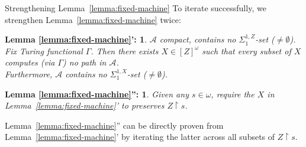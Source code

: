\begin{frame}{Strengthening Lemma~\ref{lemma:fixed-machine}}
  To iterate successfully, we strengthen Lemma~\ref{lemma:fixed-machine}
  twice:
  \newtheorem*{lemma-strengthened1*}{Lemma \ref{lemma:fixed-machine}':}
  \begin{lemma-strengthened1*}
    $\mathcal{A}$ compact, contains no $\Sigma_1^{1,Z}$-set
    ($\neq\emptyset$). Fix Turing functional $\Gamma$. Then
    there exists $X\in[Z]^\omega$ such that every subset of $X$ computes
    (via $\Gamma$) no path in $\mathcal{A}$.\\
    \vspace{0.5em}
    Furthermore, $\mathcal{A}$ contains no $\Sigma_1^{1,X}$-set
    ($\neq\emptyset$).
  \end{lemma-strengthened1*}

  \vspace{0.5em}
  \newtheorem*{lemma-strengthened2*}{Lemma \ref{lemma:fixed-machine}'':}
  \begin{lemma-strengthened2*}
    Given any $s\in\omega$, require the $X$ in
    Lemma~\ref{lemma:fixed-machine}' to preserves $Z\restriction s$.
  \end{lemma-strengthened2*}

  \vspace{0.5em}
  Lemma~\ref{lemma:fixed-machine}'' can be directly proven from
  Lemma~\ref{lemma:fixed-machine}' by iterating the latter across all
  subsets of $Z\restriction s$.
\end{frame}

